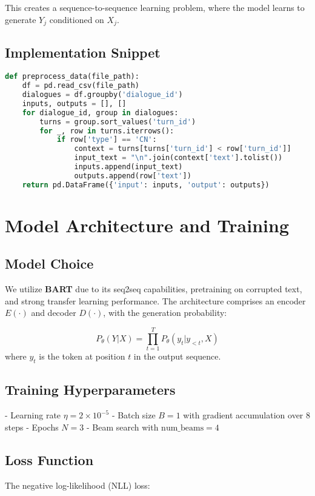 \documentclass[12pt]{article}
\begin{document}
This creates a sequence-to-sequence learning problem, where the model learns to generate \( Y_j \) conditioned on \( X_j \).

\subsection{Implementation Snippet}
\begin{lstlisting}[language=Python, basicstyle=\footnotesize\ttfamily]
def preprocess_data(file_path):
    df = pd.read_csv(file_path)
    dialogues = df.groupby('dialogue_id')
    inputs, outputs = [], []
    for dialogue_id, group in dialogues:
        turns = group.sort_values('turn_id')
        for _, row in turns.iterrows():
            if row['type'] == 'CN':
                context = turns[turns['turn_id'] < row['turn_id']]
                input_text = "\n".join(context['text'].tolist())
                inputs.append(input_text)
                outputs.append(row['text'])
    return pd.DataFrame({'input': inputs, 'output': outputs})
\end{lstlisting}

\section{Model Architecture and Training}
\subsection{Model Choice}
We utilize \textbf{BART} \cite{lewis2019bart} due to its seq2seq capabilities, pretraining on corrupted text, and strong transfer learning performance. The architecture comprises an encoder \( E(\cdot) \) and decoder \( D(\cdot) \), with the generation probability:

\begin{equation}
P_\theta(Y|X) = \prod_{t=1}^{T} P_\theta(y_t| y_{<t}, X)
\end{equation}
where \( y_t \) is the token at position \( t \) in the output sequence.

\subsection{Training Hyperparameters}
- Learning rate \( \eta = 2 \times 10^{-5} \)  
- Batch size \( B = 1 \) with gradient accumulation over 8 steps  
- Epochs \( N=3 \)  
- Beam search with \( \text{num\_beams} = 4 \)

\subsection{Loss Function}
The negative log-likelihood (NLL) loss:
\end{document}
